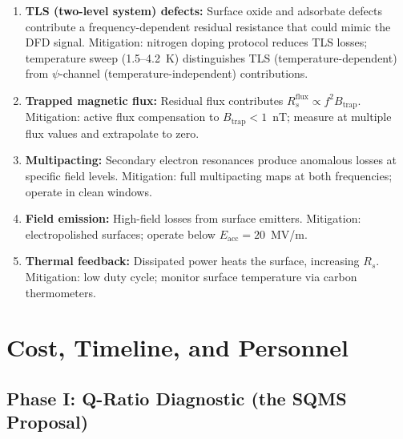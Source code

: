 \documentclass[11pt]{article}
\begin{document}
\begin{enumerate}
\item \textbf{TLS (two-level system) defects:}
Surface oxide and adsorbate defects contribute a
frequency-dependent residual resistance that could mimic the
DFD signal.  Mitigation: nitrogen doping protocol reduces TLS
losses; temperature sweep (1.5--4.2~K) distinguishes TLS
(temperature-dependent) from $\psi$-channel (temperature-independent)
contributions.

\item \textbf{Trapped magnetic flux:}
Residual flux contributes $R_s^{\text{flux}} \propto f^2 B_{\text{trap}}$.
Mitigation: active flux compensation to $B_{\text{trap}} < 1$~nT;
measure at multiple flux values and extrapolate to zero.

\item \textbf{Multipacting:}
Secondary electron resonances produce anomalous losses at specific
field levels.  Mitigation: full multipacting maps at both frequencies;
operate in clean windows.

\item \textbf{Field emission:}
High-field losses from surface emitters.  Mitigation: electropolished
surfaces; operate below $E_{\text{acc}} = 20$~MV/m.

\item \textbf{Thermal feedback:}
Dissipated power heats the surface, increasing $R_s$.  Mitigation:
low duty cycle; monitor surface temperature via carbon thermometers.
\end{enumerate}

\section{Cost, Timeline, and Personnel}
\label{sec:srf-cost}

\subsection{Phase I: Q-Ratio Diagnostic (the SQMS Proposal)}
\end{document}
